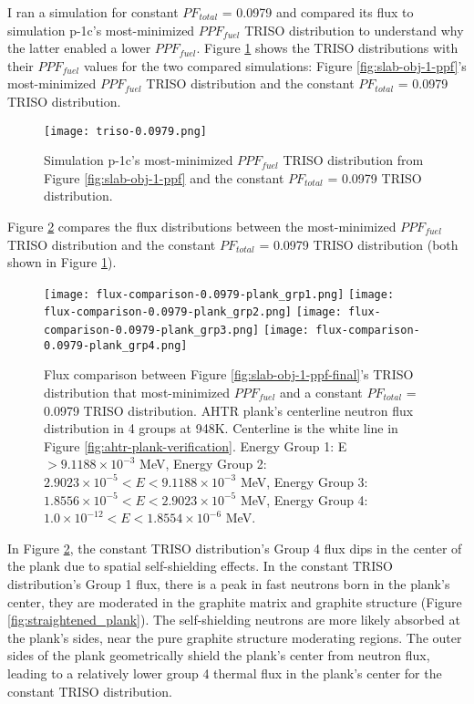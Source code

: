 I ran a simulation for constant $PF_{total}$ = 0.0979 and compared its 
flux to simulation p-1c's most-minimized $PPF_{fuel}$ TRISO distribution to understand 
why the latter enabled a lower $PPF_{fuel}$. 
Figure \ref{fig:triso-0.0979} shows the TRISO distributions with their $PPF_{fuel}$ 
values for the two compared simulations: Figure \ref{fig:slab-obj-1-ppf}'s 
most-minimized $PPF_{fuel}$ TRISO distribution and the constant $PF_{total}$ = 0.0979 
TRISO distribution. 
\begin{figure}[htbp!]
    \centering
    \texttt{[image: triso-0.0979.png]} 
    \caption{Simulation p-1c's most-minimized $PPF_{fuel}$ TRISO distribution 
    from Figure \ref{fig:slab-obj-1-ppf} and the constant $PF_{total}$ = 0.0979 
    TRISO distribution.}
    \label{fig:triso-0.0979}
\end{figure}

Figure \ref{fig:flux-comparison-0.0979-plank} compares the flux distributions between 
the most-minimized $PPF_{fuel}$ TRISO distribution and the constant $PF_{total}$ = 0.0979 
TRISO distribution (both shown in Figure \ref{fig:triso-0.0979}).
\begin{figure}[htbp!]
    \centering
    \texttt{[image: flux-comparison-0.0979-plank\_grp1.png]} 
    \texttt{[image: flux-comparison-0.0979-plank\_grp2.png]} 
    \texttt{[image: flux-comparison-0.0979-plank\_grp3.png]} 
    \texttt{[image: flux-comparison-0.0979-plank\_grp4.png]} 
    \caption{Flux comparison between Figure \ref{fig:slab-obj-1-ppf-final}'s TRISO 
    distribution that most-minimized $PPF_{fuel}$ and a constant $PF_{total}$ = 0.0979 
    TRISO distribution. 
    \acrfull{AHTR} plank's centerline neutron flux distribution in 4 groups at 948K. 
    Centerline is the white line in Figure \ref{fig:ahtr-plank-verification}.
    Energy Group 1: E $> 9.1188 \times 10^{-3}$ MeV, 
    Energy Group 2: $2.9023 \times 10^{-5} < E < 9.1188 \times 10^{-3}$ MeV,
    Energy Group 3:  $1.8556 \times 10^{-5} < E < 2.9023 \times 10^{-5}$ MeV,
    Energy Group 4:  $1.0 \times 10^{-12} < E < 1.8554 \times 10^{-6}$ MeV.}
    \label{fig:flux-comparison-0.0979-plank}
\end{figure}

In Figure \ref{fig:flux-comparison-0.0979-plank}, the constant TRISO distribution's 
Group 4 flux dips in the center of the plank due to spatial self-shielding effects. 
In the constant TRISO distribution's Group 1 flux, there is a peak in fast neutrons
born in the plank's center, they are moderated in the graphite matrix and graphite 
structure (Figure \ref{fig:straightened_plank}). 
The self-shielding neutrons are more likely absorbed at the plank's sides, near 
the pure graphite structure moderating regions. 
The outer sides of the plank geometrically shield the plank's center from neutron 
flux, leading to a relatively lower group 4 thermal flux in the plank's center for 
the constant TRISO distribution. 

